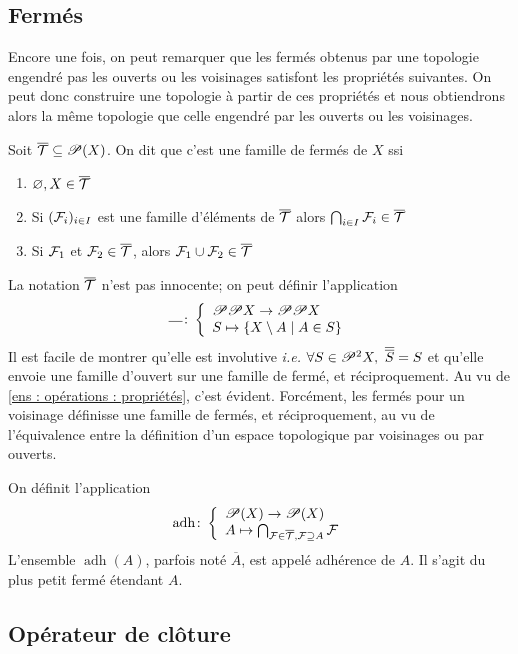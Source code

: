 \subsection{Fermés}
Encore une fois, on peut remarquer que les fermés obtenus par une topologie engendré pas les ouverts ou les voisinages satisfont les propriétés suivantes. On peut donc construire une topologie à partir de ces propriétés et nous obtiendrons alors la même topologie que celle engendré par les ouverts ou les voisinages.
\begin{definition}
    Soit $\overline{\mathcal{T}}\subseteq \mathscr{P}(X)$. On dit que c'est une famille de fermés de $X$ ssi
    \begin{enumerate}
        \item $\varnothing,X\in \overline{\mathcal{T}}$
        \item Si $(\mathcal{F}_i)_{i\in I}$ est une famille d'éléments de $\overline{\mathcal{T}}$ alors $\bigcap_{i\in I}\mathcal{F}_i\in \overline{\mathcal{T}}$
        \item Si $\mathcal{F}_1$ et $\mathcal{F}_2\in \overline{\mathcal{T}}$, alors $\mathcal{F}_1\cup \mathcal{F}_2\in \overline{\mathcal{T}}$ 
    \end{enumerate}
\end{definition}
\begin{remarque}
La notation $\overline{\mathcal{T}}$ n'est pas innocente; on peut définir l'application $$\overline{\quad }\colon \left\{\begin{array}{l}\mathscr{P}\mathscr{P} X\to\mathscr{P}\mathscr{P} X \\S\mapsto\{X\setminus A\mid A\in S\}\end{array}\right.$$Il est facile de montrer qu'elle est involutive \textit{i.e.} $\forall S\in\mathscr{P}^2X, \ \overline{\overline{S}} = S$ et qu'elle envoie une famille d'ouvert sur une famille de fermé, et réciproquement. Au vu de \ref{ens : opérations : propriétés}, c'est évident. Forcément, les fermés pour un voisinage définisse une famille de fermés, et réciproquement, au vu de l'équivalence entre la définition d'un espace topologique par voisinages ou par ouverts.
\end{remarque}
\begin{definition}
On définit l'application $$\operatorname{adh}\colon \left\{\begin{array}{l}\mathscr{P}(X)\to \mathscr{P}(X) \\A\mapsto\bigcap_{\mathcal{F}\in\overline{\mathcal{T}}, \mathcal{F}\supseteq A}\mathcal{F}\end{array}\right.$$ L'ensemble $\operatorname{adh}(A)$, parfois noté $\overline A$, est appelé adhérence de $A$. Il s'agit du plus petit fermé étendant $A$.
\end{definition}
\newpage
\subsection{Opérateur de clôture}

